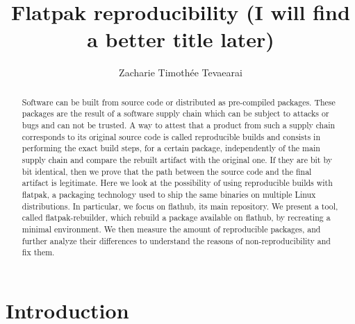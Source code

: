 \documentclass[a4paper,11pt,oneside]{report}
\title{Flatpak reproducibility (I will find a better title later)}
\author{Zacharie Timothée Tevaearai}
\theoremstyle{definition}
\newcommand{\sysname}{flatpak-rebuilder\xspace}
\newcommand{\rb}{reproducible builds\xspace}
\newcommand{\fp}{flatpak\xspace}
\newcommand{\fh}{flathub\xspace}
\begin{document}
\maketitle

\begin{abstract}
Software can be built from source code or distributed as pre-compiled packages.
These packages are the result of a software supply chain which can be
subject to attacks or bugs and can not be trusted. A way to attest that a
product from such a supply chain corresponds to its original source code is
called \rb and consists in performing the exact build steps, for a certain
package, independently of the main supply chain and compare the rebuilt
artifact with the original one. If they are bit by bit identical, then we
prove that the path between the source code and the final artifact is
legitimate. Here we look at the possibility of using reproducible builds
with \fp, a packaging technology used to ship the same binaries on multiple
Linux distributions. In particular, we focus on \fh, its main repository. We
present a tool, called \sysname, which rebuild a package available on \fh,
by recreating a minimal environment. We then measure the amount of
reproducible packages, and further analyze their differences to understand
the reasons of non-reproducibility and fix them.
\end{abstract}

\maketoc

\chapter{Introduction}
\end{document}
